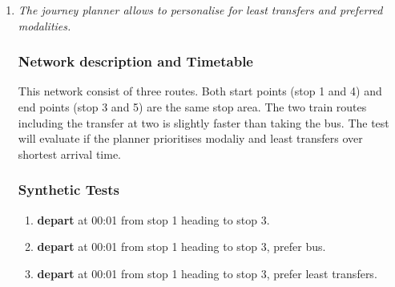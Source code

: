 \documentclass[a4paper,11pt]{article}
\begin{document}
\begin{enumerate}
\begin{enumerate}

\item \textit{The journey planner allows to personalise for least transfers and preferred modalities.}

\subsubsection*{Network description and Timetable}
This network consist of three routes.
Both start points (stop 1 and 4) and end points (stop 3 and 5) are the same stop area.
The two train routes including the transfer at two is slightly faster than taking the bus.
The test will evaluate if the planner prioritises modaliy and least transfers over shortest arrival time.

\begin{figure}[h]
\vspace{1em}
\raggedleft
\begin{minipage}{245pt}
\end{minipage}
\label{fig:singlemodality_network}
\vspace{-2em}
\end{figure}

\subsubsection*{Synthetic Tests}
\begin{enumerate}
\item \textbf{depart} at 00:01 from stop 1 heading to stop 3.
\item \textbf{depart} at 00:01 from stop 1 heading to stop 3, prefer bus.
\item \textbf{depart} at 00:01 from stop 1 heading to stop 3, prefer least transfers.
\end{enumerate}


\end{enumerate}
\end{enumerate}
\end{document}
